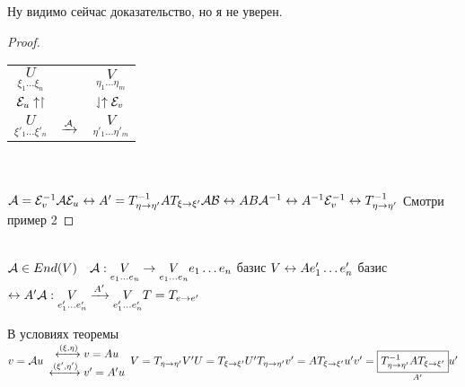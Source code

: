 \documentclass[../spring.tex]{subfiles}
\begin{document}
	Ну видимо сейчас доказательство, но я не уверен.
	\begin{proof}\ \\
		\begin{tabular}{c c c}
			$\underset{\xi_1\ldots\xi_n}{U}$ & \stackanchor{$\xrightarrow{\A}$}{$\rightharpoonup$} & $\underset{\eta_1\ldots\eta_m}{V}$\\
			$\mathcal{E}_u \uparrow \upharpoonright$ & & $\downharpoonleft \uparrow \mathcal{E}_v$\\
			$\underset{\xi'_1\ldots\xi'_n}{U}$ & $\xrightarrow{\A}$ & $\underset{\eta'_1\ldots\eta'_m}{V}$
		\end{tabular}
		\\\\
		$\mathcal{A} = \mathcal{E}^{-1}_v\mathcal{A}\mathcal{E}_u\leftrightarrow A' = T^{-1}_{\eta\rightarrow\eta'}AT_{\xi\rightarrow\xi'}\\
		\mathcal{A}\mathcal{B} \leftrightarrow AB\\
		\mathcal{A}^{-1}\leftrightarrow A^{-1}\\
		\mathcal{E}^{-1}_v \leftrightarrow T^{-1}_{\eta\rightarrow\eta'}$ Смотри пример 2
	\end{proof}
	\begin{corollary}
		\ \\
		$\mathcal{A}\in End(V) \ \ \ \mathcal{A}: \underset{e_1\ldots e_n}{V} \rightarrow \underset{e_1\ldots e_n}{V}\\
		e_1\ldots e_n$ базис $V \leftrightarrow A\\
		e'_1\ldots e'_n$ базис $\leftrightarrow A'\\
		\mathcal{A}: \underset{e'_1\ldots e'_n}{V} \xrightarrow{A'} \underset{e'_1\ldots e'_n}{V}\\
		T = T_{e\rightarrow e'}$\\
	\end{corollary}
	\begin{remark}
		В условиях теоремы $v = \mathcal{A} u \begin{array}{c}
		\xleftrightarrow{(\xi, \eta)} v = Au\\
		\xleftrightarrow{(\xi', \eta')} v' = A'u
		\end{array}\\
		V = T_{\eta\rightarrow\eta'} V'\\
		U = T_{\xi\rightarrow\xi'} U'\\
		T_{\eta\rightarrow\eta'}v' = AT_{\xi\rightarrow\xi'}u'\\
		v' = \underset{A'}{\boxed{T^{-1}_{\eta\rightarrow\eta'}AT_{\xi\rightarrow\xi'}}u'}
		$
	\end{remark}
\end{document}
